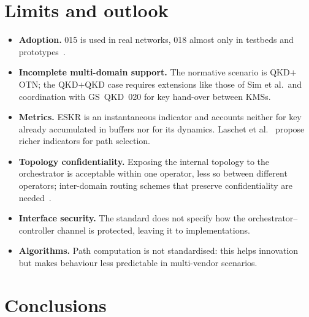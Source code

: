 \section{Limits and outlook}
\label{sec:limiti}

\begin{itemize}
  \item \textbf{Adoption.} 015 is used in real networks, 018 almost only in
        testbeds and prototypes~\cite{madqci2024}.
  \item \textbf{Incomplete multi-domain support.} The normative scenario is
        QKD$+$OTN; the QKD$+$QKD case requires extensions like those of Sim
        et al.\ and coordination with GS~QKD~020 for key hand-over between
        KMSs.
  \item \textbf{Metrics.} ESKR is an instantaneous indicator and accounts
        neither for key already accumulated in buffers nor for its
        dynamics. Laschet et al.~\cite{laschet2026} propose richer
        indicators for path selection.
  \item \textbf{Topology confidentiality.} Exposing the internal topology
        to the orchestrator is acceptable within one operator, less so
        between different operators; inter-domain routing schemes that
        preserve confidentiality are needed~\cite{laschet2026,interconnect2026}.
  \item \textbf{Interface security.} The standard does not specify how the
        orchestrator–controller channel is protected, leaving it to
        implementations.
  \item \textbf{Algorithms.} Path computation is not standardised: this
        helps innovation~\cite{routing2024,mendez2026} but makes behaviour
        less predictable in multi-vendor scenarios.
\end{itemize}

\section{Conclusions}
\label{sec:conclusioni}


